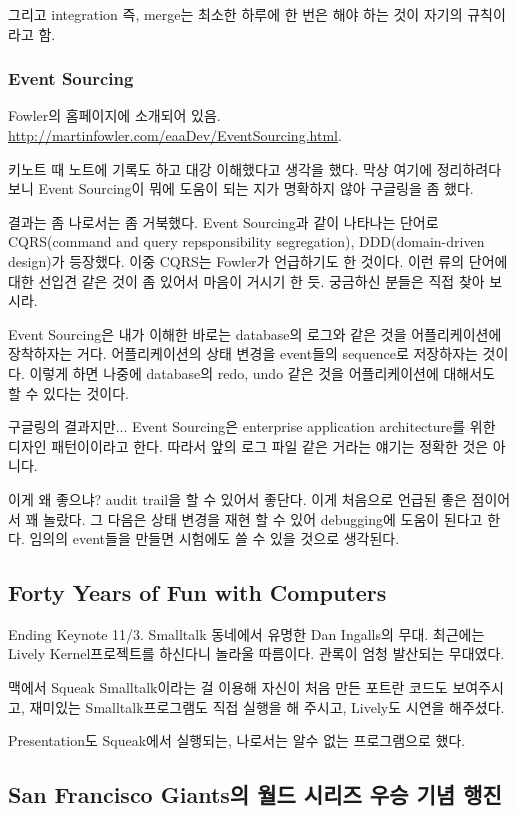 \documentclass[11pt]{article}
\begin{document}
그리고 integration 즉, merge는 최소한 하루에 한 번은 해야 하는 것이
자기의 규칙이라고 함.
 
\subsubsection{Event Sourcing}
 
Fowler의 홈페이지에 소개되어 있음.
\url{http://martinfowler.com/eaaDev/EventSourcing.html}.
 
키노트 때 노트에 기록도 하고 대강 이해했다고 생각을 했다. 막상 여기에
정리하려다 보니 Event Sourcing이 뭐에 도움이 되는 지가 명확하지 않아
구글링을 좀 했다.
 
결과는 좀 나로서는 좀 거북했다. Event Sourcing과 같이 나타나는 단어로
CQRS(command and query repsponsibility segregation), DDD(domain-driven
design)가 등장했다. 이중 CQRS는 Fowler가 언급하기도 한 것이다. 이런
류의 단어에 대한 선입견 같은 것이 좀 있어서 마음이 거시기 한
듯. 궁금하신 분들은 직접 찾아 보시라.
 
Event Sourcing은 내가 이해한 바로는 database의 로그와 같은 것을
어플리케이션에 장착하자는 거다. 어플리케이션의 상태 변경을 event들의
sequence로 저장하자는 것이다. 이렇게 하면 나중에 database의 redo, undo
같은 것을 어플리케이션에 대해서도 할 수 있다는 것이다.
 
구글링의 결과지만... Event Sourcing은 enterprise application
architecture를 위한 디자인 패턴이이라고 한다. 따라서 앞의 로그 파일
같은 거라는 얘기는 정확한 것은 아니다.
 
이게 왜 좋으냐? audit trail을 할 수 있어서 좋단다. 이게 처음으로 언급된
좋은 점이어서 꽤 놀랐다. 그 다음은 상태 변경을 재현 할 수 있어
debugging에 도움이 된다고 한다. 임의의 event들을 만들면 시험에도 쓸 수
있을 것으로 생각된다.

\subsection{Forty Years of Fun with Computers}

Ending Keynote 11/3. Smalltalk 동네에서 유명한 Dan Ingalls의 무대.
최근에는 Lively Kernel프로젝트를 하신다니 놀라울 따름이다.
관록이 엄청 발산되는 무대였다.
 
맥에서 Squeak Smalltalk이라는 걸 이용해 자신이 처음 만든 포트란 코드도
보여주시고, 재미있는 Smalltalk프로그램도 직접 실행을 해 주시고,
Lively도 시연을 해주셨다.
 
Presentation도 Squeak에서 실행되는, 나로서는 알수 없는 프로그램으로 했다.

\subsection{San Francisco Giants의 월드 시리즈 우승 기념 행진}
\end{document}
